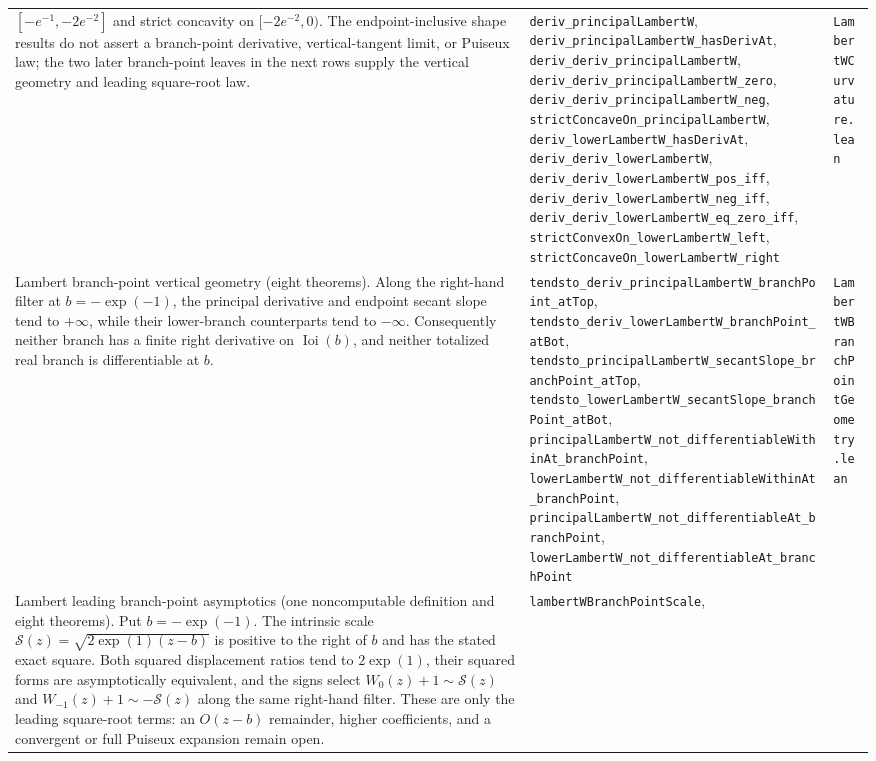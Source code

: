 \documentclass[11pt,oneside]{article}
\theoremstyle{definition}
\theoremstyle{remark}
\begin{document}
\begin{longtable}{@{}p{}p{}p{}@{}}
\([-e^{-1},-2e^{-2}]\) and strict concavity on
\([-2e^{-2},0)\).  The endpoint-inclusive shape results do not assert a
branch-point derivative, vertical-tangent limit, or Puiseux law; the two
later branch-point leaves in the next rows supply the vertical geometry and
leading square-root law. &
\nolinkurl{deriv_principalLambertW},
\nolinkurl{deriv_principalLambertW_hasDerivAt},
\nolinkurl{deriv_deriv_principalLambertW},
\nolinkurl{deriv_deriv_principalLambertW_zero},
\nolinkurl{deriv_deriv_principalLambertW_neg},
\nolinkurl{strictConcaveOn_principalLambertW},
\nolinkurl{deriv_lowerLambertW_hasDerivAt},
\nolinkurl{deriv_deriv_lowerLambertW},
\nolinkurl{deriv_deriv_lowerLambertW_pos_iff},
\nolinkurl{deriv_deriv_lowerLambertW_neg_iff},
\nolinkurl{deriv_deriv_lowerLambertW_eq_zero_iff},
\nolinkurl{strictConvexOn_lowerLambertW_left},
\nolinkurl{strictConcaveOn_lowerLambertW_right} &
\nolinkurl{LambertWCurvature.lean} \\
Lambert branch-point vertical geometry (eight theorems).  Along the
right-hand filter at \(b=-\exp(-1)\), the principal derivative and endpoint
secant slope tend to \(+\infty\), while their lower-branch counterparts tend
to \(-\infty\).  Consequently neither branch has a finite right derivative
on \(\operatorname{Ioi}(b)\), and neither totalized real branch is
differentiable at \(b\). &
\nolinkurl{tendsto_deriv_principalLambertW_branchPoint_atTop},
\nolinkurl{tendsto_deriv_lowerLambertW_branchPoint_atBot},
\nolinkurl{tendsto_principalLambertW_secantSlope_branchPoint_atTop},
\nolinkurl{tendsto_lowerLambertW_secantSlope_branchPoint_atBot},
\nolinkurl{principalLambertW_not_differentiableWithinAt_branchPoint},
\nolinkurl{lowerLambertW_not_differentiableWithinAt_branchPoint},
\nolinkurl{principalLambertW_not_differentiableAt_branchPoint},
\nolinkurl{lowerLambertW_not_differentiableAt_branchPoint} &
\nolinkurl{LambertWBranchPointGeometry.lean} \\
Lambert leading branch-point asymptotics (one noncomputable definition and
eight theorems).  Put \(b=-\exp(-1)\).  The intrinsic scale
\(\mathcal S(z)=\sqrt{2\exp(1)(z-b)}\) is positive to the right of \(b\) and
has the stated exact square.  Both squared displacement ratios tend
to \(2\exp(1)\), their squared forms are asymptotically equivalent, and the
signs select
\(W_0(z)+1\sim\mathcal S(z)\) and
\(W_{-1}(z)+1\sim-\mathcal S(z)\) along the same right-hand filter.  These are
only the leading square-root terms: an \(O(z-b)\) remainder, higher
coefficients, and a convergent or full Puiseux expansion remain open. &
\nolinkurl{lambertWBranchPointScale},

\end{longtable}
\end{document}
